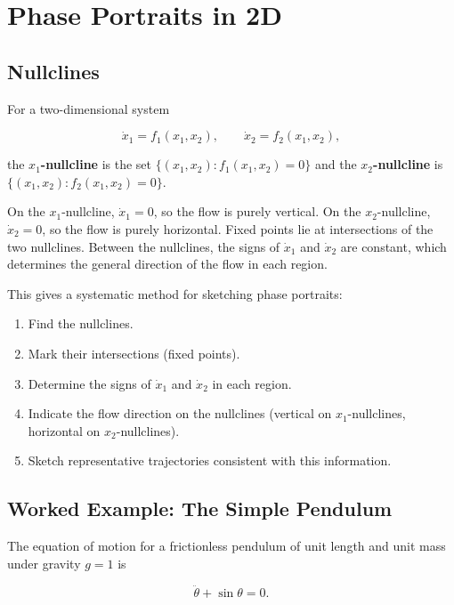 \bigskip


\section{Phase Portraits in 2D}\label{sec:3.4}

\subsection{Nullclines}\label{sec:3.4.1}

For a two-dimensional system

\[
\dot{x}_1 = f_1(x_1, x_2), \qquad \dot{x}_2 = f_2(x_1, x_2),
\]

the \textbf{$x_1$-nullcline} is the set $\{(x_1, x_2) : f_1(x_1, x_2) = 0\}$ and the \textbf{$x_2$-nullcline} is $\{(x_1, x_2) : f_2(x_1, x_2) = 0\}$.

On the $x_1$-nullcline, $\dot{x}_1 = 0$, so the flow is purely vertical. On the $x_2$-nullcline, $\dot{x}_2 = 0$, so the flow is purely horizontal. Fixed points lie at intersections of the two nullclines. Between the nullclines, the signs of $\dot{x}_1$ and $\dot{x}_2$ are constant, which determines the general direction of the flow in each region.

This gives a systematic method for sketching phase portraits:

\begin{enumerate}[nosep]
  \item Find the nullclines.
  \item Mark their intersections (fixed points).
  \item Determine the signs of $\dot{x}_1$ and $\dot{x}_2$ in each region.
  \item Indicate the flow direction on the nullclines (vertical on $x_1$-nullclines, horizontal on $x_2$-nullclines).
  \item Sketch representative trajectories consistent with this information.
\end{enumerate}

\subsection{Worked Example: The Simple Pendulum}\label{sec:3.4.2}

The equation of motion for a frictionless pendulum of unit length and unit mass under gravity $g = 1$ is

\begin{equation}\label{eq:3.5}\tag{3.5}
\ddot{\theta} + \sin\theta = 0.
\end{equation}

